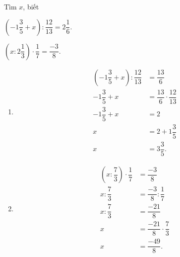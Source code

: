 \begin{vd} Tìm $x$, biết
	\begin{listEX}[2]
			\item $\left( -1\dfrac{3}{5} +x \right): \dfrac{12}{13} = 2\dfrac{1}{6} $.
		\item $\left( x: 2\dfrac{1}{3} \right) \cdot \dfrac{1}{7} = \dfrac{-3}{8} $.
	\end{listEX}
	\loigiai
	{\begin{enumerate}
			\item \begin{align*}
	\left(-1 \dfrac{3}{5} +x \right): \dfrac{12}{13} &= \dfrac{13}{6}\\
	-1\dfrac{3}{5} +x &= \dfrac{13}{6} \cdot  \dfrac{12}{13}\\
		-1\dfrac{3}{5} +x &= 2\\
		x&= 2+1\dfrac{3}{5}\\
		x&=3 \dfrac{3}{5}.
			\end{align*}
			\item \begin{align*}
\left( x: \dfrac{7}{3} \right) \cdot \dfrac{1}{7} &= \dfrac{-3}{8} \\
 x: \dfrac{7}{3} &= \dfrac{-3}{8}: \dfrac{1}{7}\\
 x: \dfrac{7}{3} &= \dfrac{-21}{8} \\
 x&= \dfrac{-21}{8} \cdot \dfrac{7}{3}\\
 x &= \dfrac{-49}{8}.
			\end{align*}
		\end{enumerate}
	}
\end{vd}	

